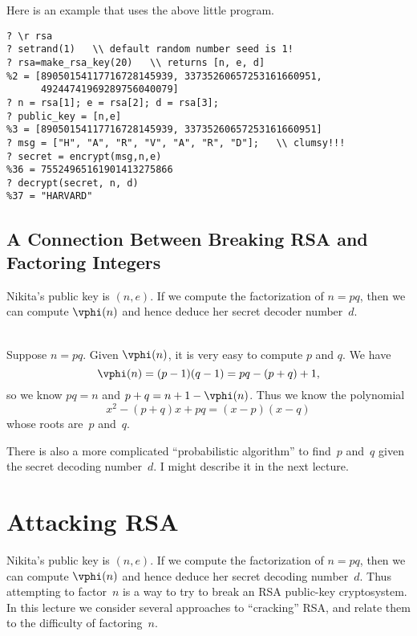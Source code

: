 \documentclass[11pt]{report}
\begin{document}
Here is an example that uses the above little program.
\begin{verbatim}
? \r rsa
? setrand(1)   \\ default random number seed is 1!
? rsa=make_rsa_key(20)   \\ returns [n, e, d]
%2 = [89050154117716728145939, 33735260657253161660951, 
      49244741969289756040079]
? n = rsa[1]; e = rsa[2]; d = rsa[3]; 
? public_key = [n,e]
%3 = [89050154117716728145939, 33735260657253161660951]
? msg = ["H", "A", "R", "V", "A", "R", "D"];   \\ clumsy!!!
? secret = encrypt(msg,n,e)
%36 = 75524965161901413275866
? decrypt(secret, n, d)
%37 = "HARVARD"
\end{verbatim}

\section{A Connection Between Breaking RSA and Factoring Integers}
Nikita's public key is $(n,e)$.
If we compute the factorization of $n=pq$, then we can compute
$\vphi(n)$ and hence deduce her secret decoder number~$d$.

\\
Suppose $n=pq$.  Given $\vphi(n)$, it is very easy to
compute $p$ and $q$.  We have
$$
  \vphi(n) = (p-1)(q-1) = pq-(p+q)+1,
$$
so we know $pq=n$ and $p+q = n+1 - \vphi(n)$.
Thus we know the polynomial
$$
  x^2 - (p+q)x + pq = (x-p)(x-q)
$$
whose roots are~$p$ and~$q$.


There is also a more complicated ``probabilistic algorithm'' to
find~$p$ and~$q$ given the secret decoding number~$d$.  I might
describe it in the next lecture.






\chapter{Attacking RSA}



Nikita's public key is $(n,e)$.  If we compute the factorization of
$n=pq$, then we can compute $\vphi(n)$ and hence deduce her secret
decoding number~$d$.  Thus attempting to factor~$n$ is a way to try to
break an RSA public-key cryptosystem. In this lecture we consider
several approaches to ``cracking'' RSA, and relate them to the
difficulty of factoring~$n$.
\end{document}
